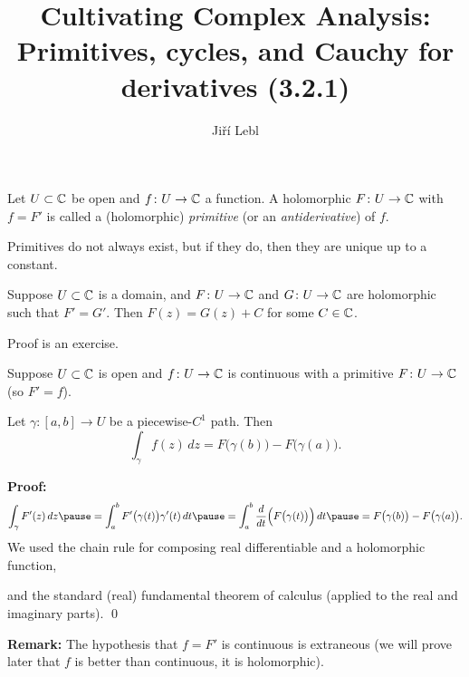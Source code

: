 \documentclass[10pt,aspectratio=169]{beamer}
\author{Ji\v{r}\'i Lebl}
\institute[OSU]{%
Departemento pri Matematiko de Oklahoma {\^S}tata Universitato}
\title{Cultivating Complex Analysis:\\%
Primitives, cycles, and Cauchy for derivatives (3.2.1)}
\date{}
\begin{document}
\begin{frame}
\titlepage
\end{frame}

\begin{frame}
\begin{definition}
Let $U \subset {\mathbb{C}}$ be open and $f \colon U \to {\mathbb{C}}$
a function.  A holomorphic $F \colon U \to {\mathbb{C}}$ with $f = F'$
is called a (holomorphic)
\emph{primitive} (or an \emph{antiderivative})
of $f$.
\end{definition}
\pause

Primitives do not always exist, but if they do, then they are unique up
to a constant.

\begin{proposition}
Suppose $U \subset {\mathbb{C}}$ is a domain, and
$F \colon U \to {\mathbb{C}}$ and
$G \colon U \to {\mathbb{C}}$ are holomorphic such that $F' = G'$.  Then
$F(z) = G(z) + C$ for some $C \in {\mathbb{C}}$.
\end{proposition}

\pause
Proof is an exercise.
\end{frame}

\begin{frame}
\begin{theorem}
Suppose $U \subset {\mathbb{C}}$ is open and $f \colon U \to {\mathbb{C}}$
is continuous with a primitive $F \colon U \to {\mathbb{C}}$ (so $F' = f$).

\pause
Let $\gamma \colon [a,b] \to U$ be a piecewise-$C^1$ path.
Then
\begin{equation*}
\int_\gamma f(z) \, dz =
F\bigl( \gamma(b) \bigr) - F\bigl( \gamma(a)
\bigr) .
\end{equation*}
\end{theorem}

\medskip
\pause

\textbf{Proof:}
\[
\int_\gamma F'(z) \, dz
\pause
=
\int_a^b F'\bigl(\gamma(t)\bigr) \gamma'(t) \, dt 
\pause
=
\int_a^b \frac{d}{dt} \Bigl( F\bigl(\gamma(t)\bigr) \Bigr) \, dt 
\pause
=
F\bigl( \gamma(b) \bigr) - F\bigl( \gamma(a) \bigr) .
\]
\pause
We used the chain rule for composing real differentiable
and a holomorphic function,

\medskip
\pause
and the standard (real)
fundamental theorem of calculus (applied to the real and imaginary parts).
\qed

\medskip
\pause
\textbf{Remark:}
The hypothesis that $f=F'$ is continuous is extraneous (we will
prove later that $f$ is better than continuous, it is holomorphic).
\end{frame}
\end{document}
